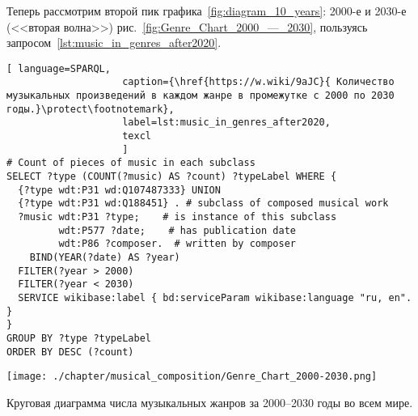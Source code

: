



Теперь рассмотрим второй пик графика~\ref{fig:diagram_10_years}: 2000-е и 2030-е (<<вторая волна>>) рис.~\ref{fig:Genre_Chart_2000_—_2030}, пользуясь запросом~\ref{lst:music_in_genres_after2020}.

\begin{lstlisting}[ language=SPARQL,
                    caption={\href{https://w.wiki/9aJC}{ Количество музыкальных произведений в каждом жанре в промежутке с 2000 по 2030 годы.}\protect\footnotemark},
                    label=lst:music_in_genres_after2020,
                    texcl 
                    ]
# Count of pieces of music in each subclass
SELECT ?type (COUNT(?music) AS ?count) ?typeLabel WHERE {
  {?type wdt:P31 wd:Q107487333} UNION 
  {?type wdt:P31 wd:Q188451} . # subclass of composed musical work
  ?music wdt:P31 ?type;    # is instance of this subclass
         wdt:P577 ?date;    # has publication date
         wdt:P86 ?composer.  # written by composer
    BIND(YEAR(?date) AS ?year)
  FILTER(?year > 2000)        
  FILTER(?year < 2030)
  SERVICE wikibase:label { bd:serviceParam wikibase:language "ru, en". }
}
GROUP BY ?type ?typeLabel
ORDER BY DESC (?count)
\end{lstlisting}%

\begin{marginfigure}[0\baselineskip]
	\texttt{[image: ./chapter/musical\_composition/Genre\_Chart\_2000-2030.png]}
	\caption{Круговая диаграмма числа музыкальных жанров за 2000--2030 годы во всем мире.}%
	\label{fig:Genre_Chart_2000_—_2030}%
\end{marginfigure}

